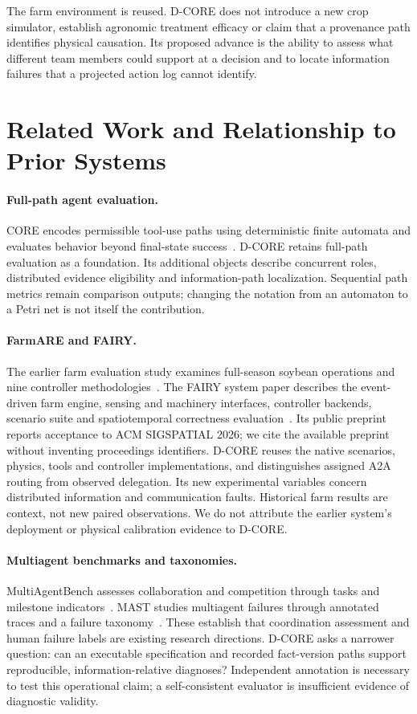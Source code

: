 \documentclass[sigconf,anonymous]{aamas}
\begin{document}
The farm environment is reused. D-CORE does not introduce a new crop simulator, establish agronomic treatment efficacy or claim that a provenance path identifies physical causation. Its proposed advance is the ability to assess what different team members could support at a decision and to locate information failures that a projected action log cannot identify.

\section{Related Work and Relationship to Prior Systems}
\paragraph{Full-path agent evaluation.}
CORE encodes permissible tool-use paths using deterministic finite automata and evaluates behavior beyond final-state success~\cite{core}. D-CORE retains full-path evaluation as a foundation. Its additional objects describe concurrent roles, distributed evidence eligibility and information-path localization. Sequential path metrics remain comparison outputs; changing the notation from an automaton to a Petri net is not itself the contribution.

\paragraph{FarmARE and FAIRY.}
The earlier farm evaluation study examines full-season soybean operations and nine controller methodologies~\cite{farmworkshop}. The FAIRY system paper describes the event-driven farm engine, sensing and machinery interfaces, controller backends, scenario suite and spatiotemporal correctness evaluation~\cite{fairy}. Its public preprint reports acceptance to ACM SIGSPATIAL 2026; we cite the available preprint without inventing proceedings identifiers. D-CORE reuses the native scenarios, physics, tools and controller implementations, and distinguishes assigned A2A routing from observed delegation. Its new experimental variables concern distributed information and communication faults. Historical farm results are context, not new paired observations. We do not attribute the earlier system's deployment or physical calibration evidence to D-CORE.

\paragraph{Multiagent benchmarks and taxonomies.}
MultiAgentBench assesses collaboration and competition through tasks and milestone indicators~\cite{multiagentbench}. MAST studies multiagent failures through annotated traces and a failure taxonomy~\cite{mast}. These establish that coordination assessment and human failure labels are existing research directions. D-CORE asks a narrower question: can an executable specification and recorded fact-version paths support reproducible, information-relative diagnoses? Independent annotation is necessary to test this operational claim; a self-consistent evaluator is insufficient evidence of diagnostic validity.
\end{document}

